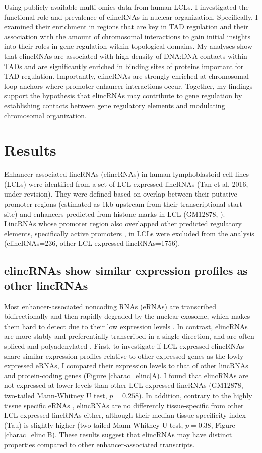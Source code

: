 \documentclass[11pt,a4paper]{report}
\begin{document}
Using publicly available multi-omics data from human LCLs. I investigated the functional role and prevalence of elincRNAs in nuclear organization. Specifically, I examined their enrichment in regions that are key in TAD regulation and their association with the amount of chromosomal interactions to gain initial insights into their roles in gene regulation within topological domains. My analyses show that elincRNAs are associated with high density of DNA:DNA contacts within TADs and are significantly enriched in binding sites of proteins important for TAD regulation. Importantly, elincRNAs are strongly enriched at chromosomal loop anchors where promoter-enhancer interactions occur. Together, my findings support the hypothesis that elincRNAs may contribute to gene regulation by establishing contacts between gene regulatory elements and modulating chromosomal organization.

\section*{Results}

Enhancer-associated lincRNAs (elincRNAs) in human lymphoblastoid cell lines (LCLs) were identified from a set of LCL-expressed lincRNAs (Tan et al, 2016, under revision). They were defined based on overlap between their putative promoter regions (estimated as 1kb upstream from their transcriptional start site) and enhancers predicted from histone marks in LCL (GM12878, \cite{ENCODEProject2012}⁠). LincRNAs whose promoter region also overlapped other predicted regulatory elements, specifically active promoters \cite{ENCODEProject2012}⁠, in LCLs were excluded from the analysis (elincRNAs=236, other LCL-expressed lincRNAs=1756).

\subsection*{elincRNAs show similar expression profiles as other lincRNAs}

Most enhancer-associated noncoding RNAs (eRNAs) are transcribed bidirectionally and then rapidly degraded by the nuclear exosome, which makes them hard to detect due to their low expression levels \cite{Darrow2013} \cite{Lam2014}⁠. In contrast, elincRNAs are more stably and preferentially transcribed in a single direction, and are often spliced and polyadenylated \cite{Marques2013a}⁠. 
First, to investigate if LCL-expressed elincRNAs share similar expression profiles relative to other expressed genes as the lowly expressed eRNAs, I compared  their expression levels to that of other lincRNAs and protein-coding genes (Figure \ref{charac_elinc}A). I found that elincRNAs are not expressed at lower levels than other LCL-expressed lincRNAs (GM12878, two-tailed Mann-Whitney U test, $p=0.258$). In addition, contrary to the highly tissue specific eRNAs \cite{Wu2014}, elincRNAs are no differently tissue-specific from other LCL-expressed lincRNAs either, although their median tissue specificity index (Tau) is slightly higher (two-tailed Mann-Whitney U test, $p=0.38$, Figure \ref{charac_elinc}B). These results suggest that elincRNAs may have distinct properties compared to other enhancer-associated transcripts.
\end{document}
